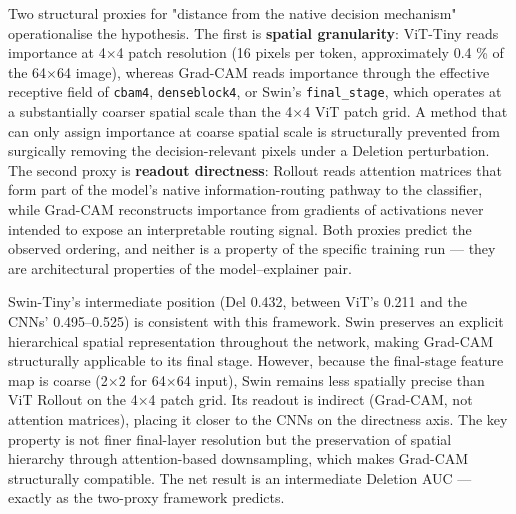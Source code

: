 \documentclass[11pt,a4paper]{article}
\begin{document}
Two structural proxies for "distance from the native decision mechanism" operationalise the hypothesis. The first is \textbf{spatial granularity}: ViT-Tiny reads importance at 4$\times$4 patch resolution (16 pixels per token, approximately 0.4 \% of the 64$\times$64 image), whereas Grad-CAM reads importance through the effective receptive field of \texttt{cbam4}, \texttt{denseblock4}, or Swin's \texttt{final\_stage}, which operates at a substantially coarser spatial scale than the 4$\times$4 ViT patch grid. A method that can only assign importance at coarse spatial scale is structurally prevented from surgically removing the decision-relevant pixels under a Deletion perturbation. The second proxy is \textbf{readout directness}: Rollout reads attention matrices that form part of the model's native information-routing pathway to the classifier, while Grad-CAM reconstructs importance from
gradients of activations never intended to expose an interpretable routing signal. Both proxies predict the observed ordering, and neither is a property of the specific training run --- they are architectural properties of the model--explainer pair.

Swin-Tiny's intermediate position (Del 0.432, between ViT's 0.211 and the CNNs' 0.495--0.525) is consistent with this framework. Swin preserves an explicit hierarchical spatial representation throughout the network, making Grad-CAM structurally applicable to its final stage. However, because the final-stage feature map is coarse (2$\times$2 for 64$\times$64 input), Swin remains less spatially precise than ViT Rollout on the 4$\times$4 patch grid. Its readout is indirect (Grad-CAM, not attention matrices), placing it closer to the CNNs on the directness axis. The key property is not finer final-layer resolution but the preservation of spatial hierarchy through attention-based downsampling, which makes Grad-CAM structurally compatible. The net result is an intermediate Deletion AUC --- exactly as the two-proxy framework predicts.
\end{document}
